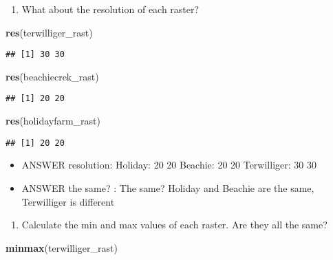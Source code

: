 \documentclass[
]{article}
\newenvironment{Shaded}{\begin{snugshade}}{\end{snugshade}}
\newcommand{\FunctionTok}[1]{\textcolor[rgb]{0.13,0.29,0.53}{\textbf{#1}}}
\newcommand{\NormalTok}[1]{#1}
\providecommand{\tightlist}{%
  \setlength{\itemsep}{0pt}\setlength{\parskip}{0pt}}
\begin{document}
\begin{enumerate}
\def\labelenumi{\alph{enumi}.}
\setcounter{enumi}{1}
\tightlist
\item
  What about the resolution of each raster?
\end{enumerate}

\begin{Shaded}
\begin{Highlighting}[]
\FunctionTok{res}\NormalTok{(terwilliger\_rast)}
\end{Highlighting}
\end{Shaded}

\begin{verbatim}
## [1] 30 30
\end{verbatim}

\begin{Shaded}
\begin{Highlighting}[]
\FunctionTok{res}\NormalTok{(beachiecrek\_rast)}
\end{Highlighting}
\end{Shaded}

\begin{verbatim}
## [1] 20 20
\end{verbatim}

\begin{Shaded}
\begin{Highlighting}[]
\FunctionTok{res}\NormalTok{(holidayfarm\_rast)}
\end{Highlighting}
\end{Shaded}

\begin{verbatim}
## [1] 20 20
\end{verbatim}

\begin{itemize}
\tightlist
\item
  ANSWER resolution: Holiday: 20 20 Beachie: 20 20 Terwilliger: 30 30
\item
  ANSWER the same? : The same? Holiday and Beachie are the same,
  Terwilliger is different
\end{itemize}

\begin{enumerate}
\def\labelenumi{\alph{enumi}.}
\setcounter{enumi}{2}
\tightlist
\item
  Calculate the min and max values of each raster. Are they all the
  same?
\end{enumerate}

\begin{Shaded}
\begin{Highlighting}[]
\FunctionTok{minmax}\NormalTok{(terwilliger\_rast)}
\end{Highlighting}
\end{Shaded}
\end{document}
